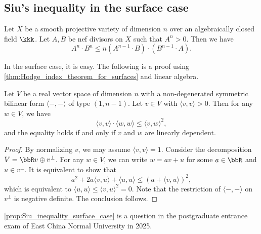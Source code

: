 \subsection{Siu's inequality in the surface case}

    \begin{theorem}\label{thm:Siu_inequality}
        Let \(X\) be a smooth projective variety of dimension \(n\) over an algebraically closed field \(\kkk\).
        Let \(A, B\) be nef divisors on \(X\) such that \(A^n > 0\).
        Then we have
        \[ A^n \cdot B^n \leq n (A^{n-1} \cdot B)\cdot (B^{n-1} \cdot A). \]
    \end{theorem}

    In the surface case, it is easy.
    The following is a proof using \cref{thm:Hodge_index_theorem_for_surfaces} and linear algebra.

    \begin{proposition}\label{prop:Siu_inequality_surface_case}
        Let \(V\) be a real vector space of dimension \(n\) with a non-degenerated symmetric bilinear form \(\langle-,-\rangle\) of type \((1, n-1)\).
        Let \(v \in V\) with \(\langle v,v \rangle > 0\).
        Then for any \(w \in V\), we have
        \[ \langle v,v \rangle \cdot \langle w,w \rangle \leq \langle v,w \rangle^2, \]
        and the equality holds if and only if \(v\) and \(w\) are linearly dependent.
    \end{proposition}
    \begin{proof}
        By normalizing \(v\), we may assume \(\langle v,v \rangle = 1\).
        Consider the decomposition \(V = \bbR v \oplus v^\perp\).
        For any \(w \in V\), we can write \(w = a v + u\) for some \(a \in \bbR\) and \(u \in v^\perp\).
        It is equivalent to show that
        \[ a^2 + 2 a \langle v,u \rangle + \langle u,u \rangle \leq (a + \langle v,u \rangle)^2, \]
        which is equivalent to \(\langle u,u \rangle \leq \langle v,u \rangle^2 = 0\).
        Note that the restriction of \(\langle-,-\rangle\) on \(v^\perp\) is negative definite.
        The conclusion follows.
    \end{proof}

    \begin{remark}\label{rmk:Siu_inequality_surface_case_postgraduate_entrance_exam}
        \cref{prop:Siu_inequality_surface_case} is a question in the postgraduate entrance exam of East China Normal University in 2025.
    \end{remark}